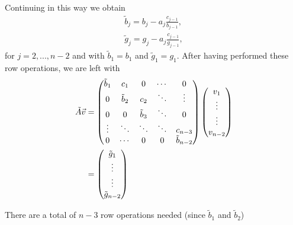 \documentclass[english,notitlepage,reprint,nofootinbib]{revtex4-2}  %
\begin{document}
Continuing in this way we obtain 
\begin{subequations}
\begin{align}
    \tilde{b}_{j} = b_{j} - a_{j}\frac{c_{j-1}}{b_{j-1}}, \\ 
    \tilde{g}_{j} = g_{j} - a_{j}\frac{c_{j-1}}{g_{j-1}}, 
\end{align}
\end{subequations}
for \(j=2,..., n-2\) and with \(\tilde{b}_1 = b_1\) and \(\tilde{g}_1 = g_1\). After having performed these row operations, we are left with 
\begin{align}
    \tilde{A}\vec{v} &= \begin{pmatrix}
        \tilde{b}_1 & c_1 & 0 & \cdots & 0 \\
        0 & \tilde{b}_2 & c_2 & \ddots & \vdots  \\
        0 & 0 & \tilde{b}_3 & \ddots & 0 \\
        \vdots & \ddots & \ddots & \ddots & c_{n-3} \\
        0 & \cdots & 0 & 0 & \tilde{b}_{n-2}
    \end{pmatrix}
    \begin{pmatrix}
        v_1 \\ \vdots \\ \vdots \\ v_{n-2}
    \end{pmatrix}
    \notag \\
    &= \begin{pmatrix}
        \tilde{g}_1 \\ \vdots\\ \vdots \\ \tilde{g}_{n-2}
    \end{pmatrix}
\end{align}

There are a total of \(n-3\) row operations needed (since \(\tilde{b}_1\) and \(\tilde{b}_2\)) 


\onecolumngrid
% 


\end{document}
